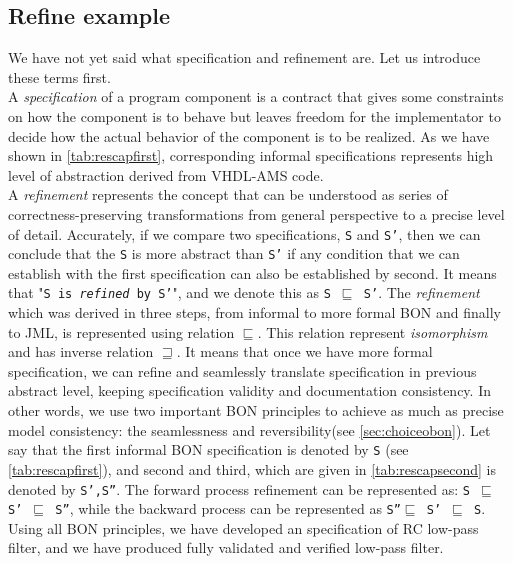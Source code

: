 \documentclass{article}
\begin{document}
\subsection{Refine example }
\label{subsec:refine}     
We have not yet said what specification and refinement are.
Let us introduce these terms first.\\
A \emph{specification} of a program component is a 
contract that gives some constraints 
on how the component is to behave but leaves freedom for the implementator to 
decide how the actual behavior of the component is to be realized. 
As we have shown in \autoref{tab:rescapfirst}, corresponding 
informal specifications represents high level of abstraction derived 
from VHDL-AMS code.\\
A \emph{refinement} represents the concept that can be understood as series of 
correctness-preserving transformations from general perspective to 
a precise level of detail. Accurately, if we compare two specifications,
\texttt{S} and \texttt{S'}, then we can conclude that the \texttt{S} 
is more abstract than \texttt{S'} if any condition that we can establish 
with the first specification can also be established by second. 
It means that "\texttt{S is \emph{refined} by S'}", 
and we denote this  as \texttt{S $\sqsubseteq$ S'}.
The \emph{refinement} which was derived in three steps, 
from informal to more formal BON and finally to JML, 
is represented using relation \texttt{$\sqsubseteq$}. This relation represent 
\emph{isomorphism} and has inverse relation \texttt{$\sqsupseteq$}. 
It means that once we have more formal specification, we can refine 
and seamlessly  translate specification in previous abstract level,  
keeping specification validity and documentation consistency. 
In other  words, we use two important BON principles to achieve 
as much as precise model consistency: the seamlessness and  
reversibility(see \autoref{sec:choiceobon}). 
Let say that the first informal BON specification is denoted by 
\texttt{S} (see \autoref{tab:rescapfirst}), and second and third,
which are given in \autoref{tab:rescapsecond}  is denoted by \texttt{S',S''}.
The forward process refinement can be represented as:\xspace
\texttt{S $\sqsubseteq$ S' $\sqsubseteq$ S''}, while the backward process
can be represented as \xspace \texttt{S''$\sqsubseteq$ S' $\sqsubseteq$ S}.  
Using all BON principles, we have developed an specification of RC low-pass
filter, and we have produced fully validated and verified low-pass filter.


\end{document}
